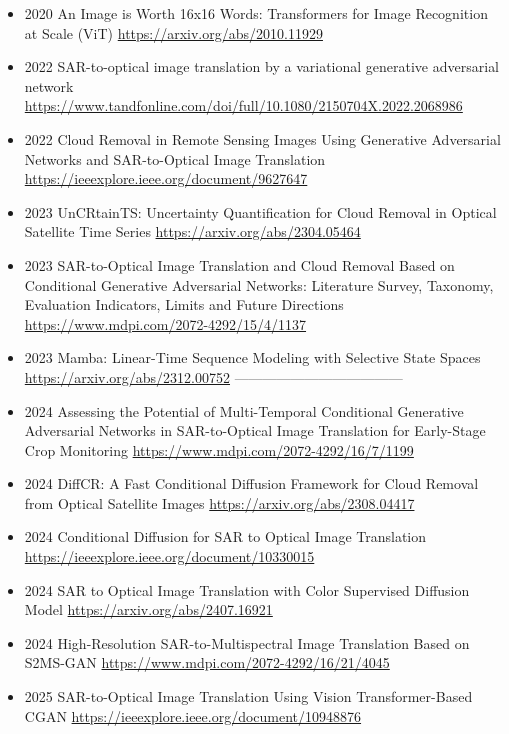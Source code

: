 \begin{itemize}
    \item 2020 An Image is Worth 16x16 Words: Transformers for Image Recognition at Scale (ViT)
    \url{https://arxiv.org/abs/2010.11929}

    \item 2022 SAR-to-optical image translation by a variational generative adversarial network
    \url{https://www.tandfonline.com/doi/full/10.1080/2150704X.2022.2068986}

    \item 2022 Cloud Removal in Remote Sensing Images Using Generative Adversarial Networks and SAR-to-Optical Image Translation
    \url{https://ieeexplore.ieee.org/document/9627647}

    \item 2023 UnCRtainTS: Uncertainty Quantification for Cloud Removal in Optical Satellite Time Series
    \url{https://arxiv.org/abs/2304.05464}
    
    \item 2023 SAR-to-Optical Image Translation and Cloud Removal Based on Conditional Generative Adversarial Networks: Literature Survey, Taxonomy, Evaluation Indicators, Limits and Future Directions
    \url{https://www.mdpi.com/2072-4292/15/4/1137}

    \item 2023 Mamba: Linear-Time Sequence Modeling with Selective State Spaces
    \url{https://arxiv.org/abs/2312.00752}
------------------------------------
    
    \item 2024 Assessing the Potential of Multi-Temporal Conditional Generative Adversarial Networks in SAR-to-Optical Image Translation for Early-Stage Crop Monitoring
        \url{https://www.mdpi.com/2072-4292/16/7/1199}
    

    \item 2024 DiffCR: A Fast Conditional Diffusion Framework for Cloud Removal from Optical Satellite Images
    \url{https://arxiv.org/abs/2308.04417}

    \item 2024  Conditional Diffusion for SAR to Optical Image Translation
    \url{https://ieeexplore.ieee.org/document/10330015}



    \item 2024  SAR to Optical Image Translation with Color Supervised Diffusion Model
    \url{https://arxiv.org/abs/2407.16921}
    

    \item 2024  High-Resolution SAR-to-Multispectral Image Translation Based on S2MS-GAN
    \url{https://www.mdpi.com/2072-4292/16/21/4045}

    
    \item 2025 SAR-to-Optical Image Translation Using Vision Transformer-Based CGAN
    \url{https://ieeexplore.ieee.org/document/10948876}
    

    
    
\end{itemize}
